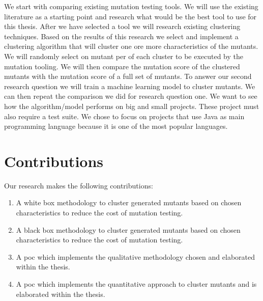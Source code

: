 \documentclass[../main]{subfiles}
\begin{document}
\newline
We start with comparing existing mutation testing tools. 
We will use the existing literature as a starting point and research what would be the best tool to use for this thesis.
\newline
After we have selected a tool we will research existing clustering techniques.
Based on the results of this research we select and implement a clustering algorithm that will cluster one ore more characteristics of the mutants. 
We will randomly select on mutant per of each cluster to be executed by the mutation tooling.
We will then compare the mutation score of the clustered mutants with the mutation score of a full set of mutants.
\newline
To answer our second research question we will train a machine learning model to cluster mutants.
We can then repeat the comparison we did for research question one. 
\newline
We want to see how the algorithm/model performs on big and small projects.
These project must also require a test suite.
\newline
We chose to focus on projects that use Java as main programming language because it is one of the most popular languages\cite{Tiobe}.

\section{Contributions}
Our research makes the following contributions:
\begin{enumerate}
 \item A white box methodology to cluster generated mutants based on chosen characteristics to reduce the cost of mutation testing.
  \item A black box methodology to cluster generated mutants based on chosen characteristics to reduce the cost of mutation testing.
 \item A \acrfull{poc} which implements the qualitative methodology chosen and elaborated within the thesis.
 \item A \acrfull{poc} which implements the quantitative approach to cluster mutants and is elaborated within the thesis. 
\end{enumerate}
\end{document}
